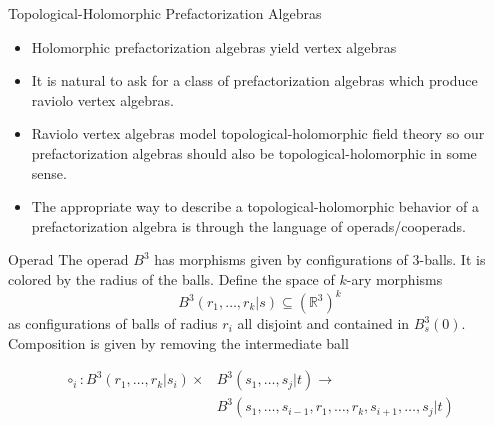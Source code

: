 \documentclass{beamer}
\newcommand{\R}{\mathbb{R}}
\begin{document}
\begin{frame}{Topological-Holomorphic Prefactorization Algebras}
\begin{itemize}
    \item Holomorphic prefactorization algebras yield vertex algebras
    \item It is natural to ask for a class of prefactorization algebras which produce raviolo vertex algebras.
    \item Raviolo vertex algebras model topological-holomorphic field theory so our prefactorization algebras should also be topological-holomorphic in some sense.
    \item The appropriate way to describe a topological-holomorphic behavior of a prefactorization algebra is through the language of operads/cooperads.
\end{itemize}
\end{frame}

\begin{frame}{Operad}
    The operad $B^3$ has morphisms given by configurations of 3-balls. It is colored by the radius of the balls. Define the space of $k$-ary morphisms
    \[
        B^3(r_1,\dots,r_k|s)\subseteq (\R^3)^k
    \]
    as configurations of balls of radius $r_i$ all disjoint and contained in $B^3_s(0)$. Composition is given by removing the intermediate ball 
    
    \begin{align*}
    \circ_i: B^3(r_1,\dots,r_k|s_i)\times & B^3(s_1,\dots,s_j|t)\to \\ & B^3(s_1,\dots,s_{i-1},r_1,\dots,r_k,s_{i+1},\dots,s_j|t)
    \end{align*}
    

\begin{center}
\end{center}
\end{frame}
\end{document}

